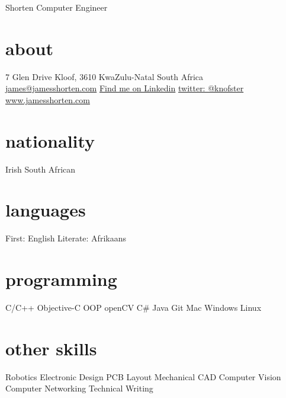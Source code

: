 \documentclass[a4paper]{friggeri-cv}
\begin{document}
 { Shorten}
       {Computer Engineer}


\begin{aside}
  \section{about}
    7 Glen Drive
    Kloof, 3610
    KwaZulu-Natal
    South Africa 
    ~
    \href{mailto:james@jamesshorten.com}{james@jamesshorten.com}
    \href{http://za.linkedin.com/in/knofst}{Find me on Linkedin}
    \href{https://twitter.com/knofster}{twitter: @knofster}
    \href{www.jamesshorten.com}{www.jamesshorten.com}
    
  \section{nationality}
    Irish
    South African
  \section{languages}
    First: English
    Literate: Afrikaans
  \section{programming}
    C/C++
    Objective-C
    OOP
    openCV
    C\#
    Java
    Git
    Mac
    Windows
    Linux
  \section{other skills}
    Robotics
  	Electronic Design
  	PCB Layout
  	Mechanical CAD
  	Computer Vision
  	Computer Networking
  	Technical Writing
\end{aside}
\end{document}
